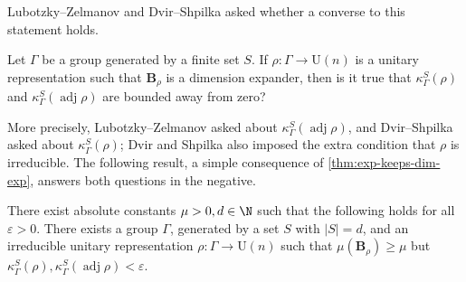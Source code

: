 \documentclass{toc}
\theoremstyle{plain}
\numberwithin{equation}{section}
\theoremstyle{definition}
\DeclareMathOperator\adj{adj}
\newcommand{\ab}[1]{\left\lvert#1\right\rvert}
\newcommand{\U}{\mathrm{U}}
\newcommand{\tuple}[1]{\mathbf{#1}}
\newcommand{\vB}{\tuple{B}}
\begin{document}
Lubotzky--Zelmanov \cite[Remark/Question 2.5]{LUBOTZKY2008730} and Dvir--Shpilka \cite[Question 1]{DS09} asked whether a converse to this statement holds. 
\begin{closedquestion}
    Let $\Gamma$ be a group generated by a finite set $S$. If $\rho:\Gamma \to \U(n)$ is a unitary representation such that $\vB_\rho$ is a dimension expander, then is it true that $\kappa_\Gamma^S(\rho)$ and $\kappa_\Gamma^S(\adj \rho)$ are bounded away from zero? 
\end{closedquestion}
More precisely, Lubotzky--Zelmanov asked about $\kappa_\Gamma^S(\adj \rho)$, and Dvir--Shpilka asked about $\kappa_\Gamma^S(\rho)$; Dvir and Shpilka also imposed the extra condition that $\rho$ is irreducible. The following result, a simple consequence of \cref{thm:exp-keeps-dim-exp}, answers both questions in the negative.
\begin{theorem}\label{thm:no property T}
    There exist absolute constants $\mu>0, d \in \N$ such that the following holds for all $\varepsilon>0$. There exists a group $\Gamma$, generated by a set $S$ with $\ab S=d$, and an irreducible unitary representation $\rho:\Gamma \to \U(n)$ such that $\mu(\vB_\rho) \geq \mu$ but $\kappa_\Gamma^S(\rho), \kappa_\Gamma^S(\adj \rho) < \varepsilon$.
\end{theorem}
\end{document}
